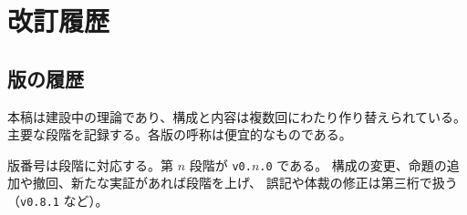 \chapter{改訂履歴}
\label{app:revisions}

\section{版の履歴}
\label{sec:version-history}

本稿は建設中の理論であり、構成と内容は複数回にわたり作り替えられている。
主要な段階を記録する。各版の呼称は便宜的なものである。

版番号は段階に対応する。第 $n$ 段階が \texttt{v0.$n$.0} である。
構成の変更、命題の追加や撤回、新たな実証があれば段階を上げ、
誤記や体裁の修正は第三桁で扱う（\texttt{v0.8.1} など）。

